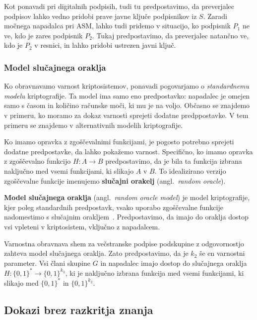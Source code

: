 \documentclass[isrm2, tisk]{fmfdelo}
\begin{document}
Kot ponavadi pri digitalnih podpisih, tudi tu predpostavimo, da preverjalec podpisov lahko vedno 
pridobi prave javne ključe podpisnikov iz $S$. Zaradi močnega napadalca pri ASM, lahko tudi pridemo 
v situacijo, ko podpisnik $P_1$ ne ve, kdo je zares podpisnik $P_2$. Tukaj predpostavimo, da preverjalec
natančno ve, kdo je $P_2$ v resnici, in lahko pridobi ustrezen javni ključ. 

\subsubsection{Model slučajnega oraklja}
Ko obravnavamo varnost kriptosistemov, ponavadi pogovarjamo o \textit{standardnemu modelu} kriptografije. 
Ta model ima samo eno predpostavko: napadalec je omejen samo s časom in količino računske moči, ki mu 
je na voljo. Občasno se znajdemo v primeru, ko moramo za dokaz varnosti sprejeti dodatne predppostavke. 
V tem primeru se znajdemo v alternativnih modelih kriptografije. 

Ko imamo opravka z zgoščevalnimi funkcijami, je pogosto potrebno sprejeti dodatne predpostavke, da lahko 
pokažemo varnost. Specifično, ko imamo opravka z zgoščevalno funkcijo $H: A \rightarrow B$ predpostavimo, 
da je bila ta funkcija izbrana naključno med vsemi funkcijami, ki slikajo $A$ v $B$. To idealizirano 
verzijo zgoščevalne funkcije imenujemo \textbf{slučajni orakelj} (angl.\ \textit{random oracle}).

\textbf{Model slučajnega oraklja} (angl.\ \textit{random oracle model}) je model kriptografije, kjer poleg 
standardnih predpostavk, vsako uporabo zgoščevalne funkcije nadomestimo s slučajnim 
orakljem~\cite{boneh2023appcry}. Predpostavimo, da imajo do oraklja dostop vsi vpleteni v kriptosistem, 
vključno z napadalcem.

\begin{definicija}
    Varnostna obravnava shem za večstranske podpise podskupine z odgovornostjo zahteva model slučajnega 
    oraklja. Zato predpostavimo, da je $k_2$ še en varnostni parameter. Vsi člani skupine $G$ in 
    napadalec imajo dostop do slučajnega oraklja $H: \{0, 1\}^* \rightarrow \{0, 1\}^{k_2}$, ki je 
    naključno izbrana funkcija med vsemi funkcijami, ki slikajo med $\{0, 1\}^*$ in $\{0, 1\}^{k_2}$.
\end{definicija}

\subsection{Dokazi brez razkritja znanja}
\end{document}
